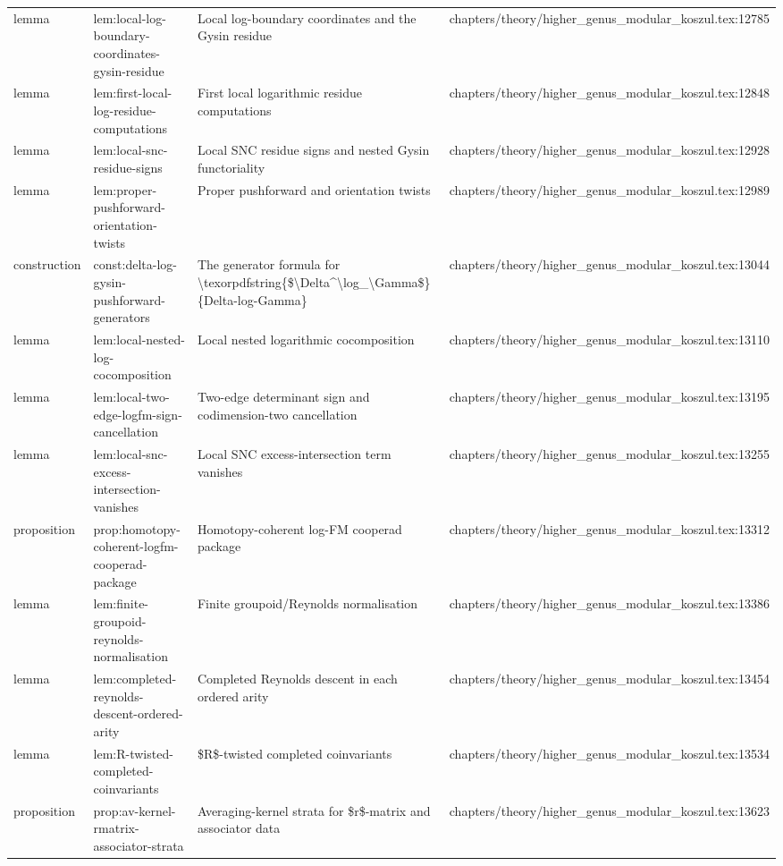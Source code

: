 \documentclass[11pt]{article}
\begin{document}
\begin{longtable}{L{0.10\textwidth}L{0.26\textwidth}L{0.42\textwidth}L{0.22\textwidth}}
lemma & lem:local-log-boundary-coordinates-gysin-residue & Local log-boundary coordinates and the Gysin residue & chapters/theory/higher\_genus\_modular\_koszul.tex:12785\\
lemma & lem:first-local-log-residue-computations & First local logarithmic residue computations & chapters/theory/higher\_genus\_modular\_koszul.tex:12848\\
lemma & lem:local-snc-residue-signs & Local SNC residue signs and nested Gysin functoriality & chapters/theory/higher\_genus\_modular\_koszul.tex:12928\\
lemma & lem:proper-pushforward-orientation-twists & Proper pushforward and orientation twists & chapters/theory/higher\_genus\_modular\_koszul.tex:12989\\
construction & const:delta-log-gysin-pushforward-generators & The generator formula for \textbackslash{}texorpdfstring\{\$\textbackslash{}Delta\textasciicircum{}\textbackslash{}log\_\textbackslash{}Gamma\$\}\{Delta-log-Gamma\} & chapters/theory/higher\_genus\_modular\_koszul.tex:13044\\
lemma & lem:local-nested-log-cocomposition & Local nested logarithmic cocomposition & chapters/theory/higher\_genus\_modular\_koszul.tex:13110\\
lemma & lem:local-two-edge-logfm-sign-cancellation & Two-edge determinant sign and codimension-two cancellation & chapters/theory/higher\_genus\_modular\_koszul.tex:13195\\
lemma & lem:local-snc-excess-intersection-vanishes & Local SNC excess-intersection term vanishes & chapters/theory/higher\_genus\_modular\_koszul.tex:13255\\
proposition & prop:homotopy-coherent-logfm-cooperad-package & Homotopy-coherent log-FM cooperad package & chapters/theory/higher\_genus\_modular\_koszul.tex:13312\\
lemma & lem:finite-groupoid-reynolds-normalisation & Finite groupoid/Reynolds normalisation & chapters/theory/higher\_genus\_modular\_koszul.tex:13386\\
lemma & lem:completed-reynolds-descent-ordered-arity & Completed Reynolds descent in each ordered arity & chapters/theory/higher\_genus\_modular\_koszul.tex:13454\\
lemma & lem:R-twisted-completed-coinvariants & \$R\$-twisted completed coinvariants & chapters/theory/higher\_genus\_modular\_koszul.tex:13534\\
proposition & prop:av-kernel-rmatrix-associator-strata & Averaging-kernel strata for \$r\$-matrix and associator data & chapters/theory/higher\_genus\_modular\_koszul.tex:13623\\

\end{longtable}
\end{document}
